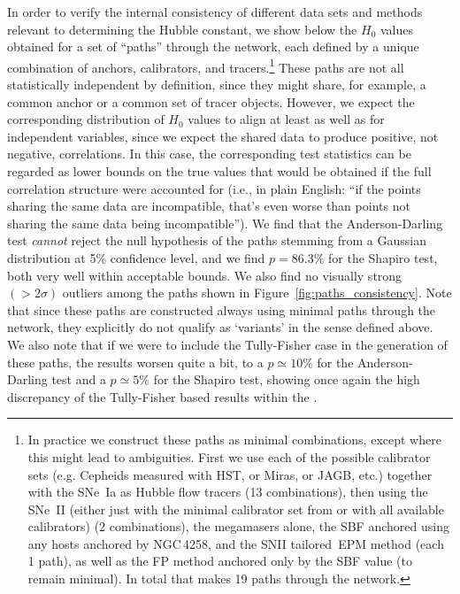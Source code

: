 In order to verify the internal consistency of different data sets and methods relevant to determining the Hubble constant, 
we show below the $H_0$ values obtained for a set of ``paths'' through the network, each defined by a unique combination of anchors, calibrators, and tracers.\footnote{In practice we construct these paths as minimal combinations, except where this might lead to ambiguities. First we use each of the possible calibrator sets (e.g. Cepheids measured with HST, or Miras, or JAGB, etc.) together with the SNe~Ia as Hubble flow tracers (13 combinations), then using the SNe~II (either just with the minimal calibrator set from \citet{2020MNRAS.496.3402D} or with all available calibrators) (2 combinations), the megamasers alone, the SBF anchored using any hosts anchored by NGC$\,$4258, and the SNII tailored~EPM method (each 1 path), as well as the FP method anchored only by the SBF value (to remain minimal). In total that makes 19 paths through the network.} These paths are not all statistically independent by definition, since they might share, for example, a common anchor or a common set of tracer objects. However, we expect the corresponding distribution of $H_0$ values to align at least as well as for independent variables, since we expect the shared data to produce positive, not negative, correlations. In this case, the corresponding test statistics can be regarded as lower bounds on the true values that would be obtained if the full correlation structure were accounted for (i.e., in plain English: ``if the points sharing the same data are incompatible, that's even worse than points not sharing the same data being incompatible''). We find that the Anderson-Darling test \textit{cannot} reject the null hypothesis of the paths stemming from a Gaussian distribution at 5\% confidence level, and we find $p=86.3\%$ for the Shapiro test, both very well within acceptable bounds. We also find no visually strong $(>2\sigma)$ outliers among the paths shown in Figure~\ref{fig:paths_consistency}. Note that since these paths are constructed always using minimal paths through the network, they explicitly do not qualify as `variants' in the sense defined above. We also note that if we were to include the Tully-Fisher case in the generation of these paths, the results worsen quite a bit, to a $p \simeq 10\%$ for the Anderson-Darling test and a $p\simeq 5\%$ for the Shapiro test, showing once again the high discrepancy of the Tully-Fisher based results within the {\DN}.

